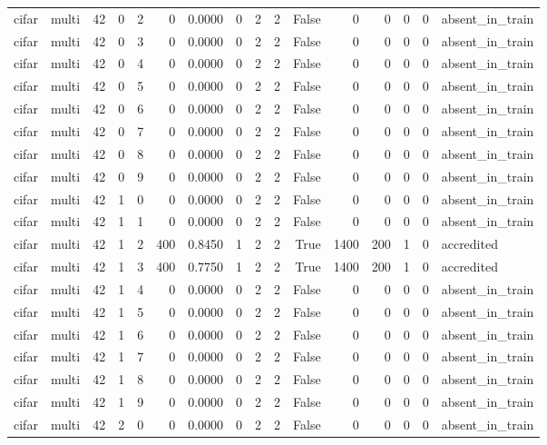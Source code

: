 \begin{tabular}{llrrrrrrrrrrrrrl}
cifar & multi & 42 & 0 & 2 & 0 & 0.0000 & 0 & 2 & 2 & False & 0 & 0 & 0 & 0 & absent\_in\_train \\
cifar & multi & 42 & 0 & 3 & 0 & 0.0000 & 0 & 2 & 2 & False & 0 & 0 & 0 & 0 & absent\_in\_train \\
cifar & multi & 42 & 0 & 4 & 0 & 0.0000 & 0 & 2 & 2 & False & 0 & 0 & 0 & 0 & absent\_in\_train \\
cifar & multi & 42 & 0 & 5 & 0 & 0.0000 & 0 & 2 & 2 & False & 0 & 0 & 0 & 0 & absent\_in\_train \\
cifar & multi & 42 & 0 & 6 & 0 & 0.0000 & 0 & 2 & 2 & False & 0 & 0 & 0 & 0 & absent\_in\_train \\
cifar & multi & 42 & 0 & 7 & 0 & 0.0000 & 0 & 2 & 2 & False & 0 & 0 & 0 & 0 & absent\_in\_train \\
cifar & multi & 42 & 0 & 8 & 0 & 0.0000 & 0 & 2 & 2 & False & 0 & 0 & 0 & 0 & absent\_in\_train \\
cifar & multi & 42 & 0 & 9 & 0 & 0.0000 & 0 & 2 & 2 & False & 0 & 0 & 0 & 0 & absent\_in\_train \\
cifar & multi & 42 & 1 & 0 & 0 & 0.0000 & 0 & 2 & 2 & False & 0 & 0 & 0 & 0 & absent\_in\_train \\
cifar & multi & 42 & 1 & 1 & 0 & 0.0000 & 0 & 2 & 2 & False & 0 & 0 & 0 & 0 & absent\_in\_train \\
cifar & multi & 42 & 1 & 2 & 400 & 0.8450 & 1 & 2 & 2 & True & 1400 & 200 & 1 & 0 & accredited \\
cifar & multi & 42 & 1 & 3 & 400 & 0.7750 & 1 & 2 & 2 & True & 1400 & 200 & 1 & 0 & accredited \\
cifar & multi & 42 & 1 & 4 & 0 & 0.0000 & 0 & 2 & 2 & False & 0 & 0 & 0 & 0 & absent\_in\_train \\
cifar & multi & 42 & 1 & 5 & 0 & 0.0000 & 0 & 2 & 2 & False & 0 & 0 & 0 & 0 & absent\_in\_train \\
cifar & multi & 42 & 1 & 6 & 0 & 0.0000 & 0 & 2 & 2 & False & 0 & 0 & 0 & 0 & absent\_in\_train \\
cifar & multi & 42 & 1 & 7 & 0 & 0.0000 & 0 & 2 & 2 & False & 0 & 0 & 0 & 0 & absent\_in\_train \\
cifar & multi & 42 & 1 & 8 & 0 & 0.0000 & 0 & 2 & 2 & False & 0 & 0 & 0 & 0 & absent\_in\_train \\
cifar & multi & 42 & 1 & 9 & 0 & 0.0000 & 0 & 2 & 2 & False & 0 & 0 & 0 & 0 & absent\_in\_train \\
cifar & multi & 42 & 2 & 0 & 0 & 0.0000 & 0 & 2 & 2 & False & 0 & 0 & 0 & 0 & absent\_in\_train \\

\end{tabular}
